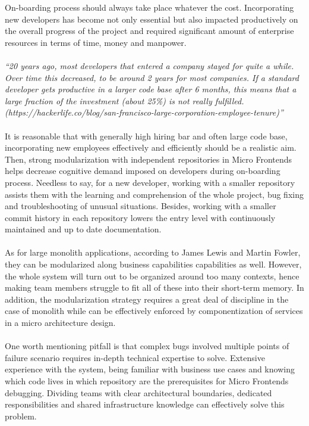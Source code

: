 \documentclass[a4paper]{book}
\begin{document}
On-boarding process should always take place whatever the cost. Incorporating new developers has become not only essential but also impacted productively on the overall progress of the project and required significant amount of enterprise resources in terms of time, money and manpower. 
\\ 
\\
\textit{“20 years ago, most developers that entered a company stayed for quite a while. Over time this decreased, to be around 2 years for most companies. If a standard developer gets productive in a larger code base after 6 months, this means that a large fraction of the investment (about 25\%) is not really fulfilled.  (https://hackerlife.co/blog/san-francisco-large-corporation-employee-tenure)”} \cite{Rap20}
\\
\\
It is reasonable that with generally high hiring bar and often large code base, incorporating new employees effectively and efficiently should be a realistic aim. Then, strong modularization with independent repositories in Micro Frontends helps decrease cognitive demand imposed on developers during on-boarding process. Needless to say, for a new developer, working with a smaller repository assists them with the learning and comprehension of the whole project, bug fixing and troubleshooting of unusual situations. Besides, working with a smaller commit history in each repository lowers the entry level with continuously maintained and up to date documentation. \cite{Rap20}
\\
\\
As for large monolith applications, according to James Lewis and Martin Fowler, they can be modularized  along business capabilities capabilities as well. However, the whole system will turn out to be organized around too many contexts, hence making team members struggle to fit all of these into their short-term memory. In addition, the modularization strategy requires a great deal of discipline in the case of monolith while can be effectively enforced by componentization of services in a micro architecture design. \cite{Lew14}
\\
\\
One worth mentioning pitfall is that complex bugs involved multiple points of failure scenario requires in-depth technical expertise to solve. Extensive experience with the system, being familiar with business use cases and knowing which code lives in which repository are the prerequisites for Micro Frontends debugging. Dividing teams with clear architectural boundaries, dedicated responsibilities and shared infrastructure knowledge can effectively solve this problem.
\end{document}
